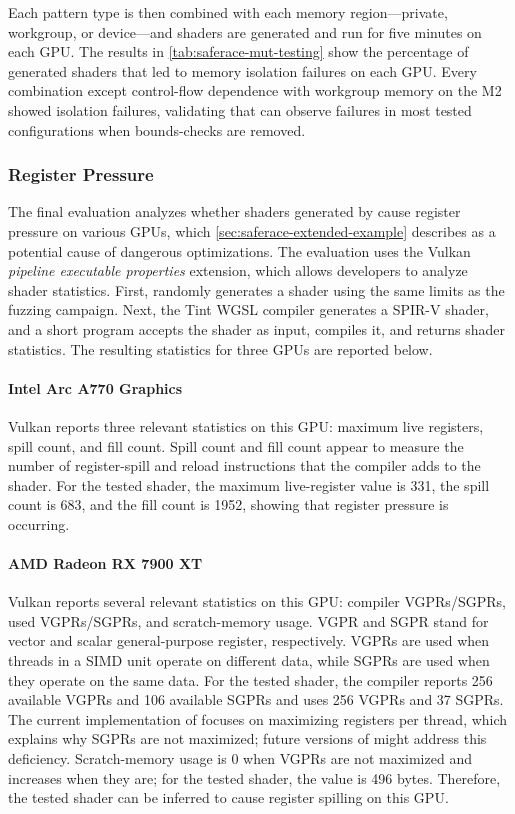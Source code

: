 Each pattern type is then combined with each memory region---private, workgroup, or device---and shaders are generated and run for five minutes on each GPU. The results in \mytab\ref{tab:saferace-mut-testing} show the percentage of generated shaders that led to memory isolation failures on each GPU. Every combination except control-flow dependence with workgroup memory on the M2 showed isolation failures, validating that \wgslmemsmith can observe failures in most tested configurations when bounds-checks are removed.

\subsubsection{Register Pressure}
The final evaluation analyzes whether shaders generated by \wgslmemsmith cause register pressure on various GPUs, which \mysec\ref{sec:saferace-extended-example} describes as a potential cause of dangerous optimizations. The evaluation uses the Vulkan \textit{pipeline executable properties} extension, which allows developers to analyze shader statistics. First, \wgslmemsmith randomly generates a shader using the same limits as the fuzzing campaign. Next, the Tint WGSL compiler generates a SPIR-V shader, and a short program accepts the shader as input, compiles it, and returns shader statistics. The resulting statistics for three GPUs are reported below.

\paragraph{Intel Arc A770 Graphics} Vulkan reports three relevant statistics on this GPU: maximum live registers, spill count, and fill count. Spill count and fill count appear to measure the number of register-spill and reload instructions that the compiler adds to the shader. For the tested shader, the maximum live-register value is 331, the spill count is 683, and the fill count is 1952, showing that register pressure is occurring.

\paragraph{AMD Radeon RX 7900 XT} Vulkan reports several relevant statistics on this GPU: compiler VGPRs/SGPRs, used VGPRs/SGPRs, and scratch-memory usage. VGPR and SGPR stand for vector and scalar general-purpose register, respectively. VGPRs are used when threads in a SIMD unit operate on different data, while SGPRs are used when they operate on the same data. For the tested shader, the compiler reports 256 available VGPRs and 106 available SGPRs and uses 256 VGPRs and 37 SGPRs. The current implementation of \wgslmemsmith focuses on maximizing registers per thread, which explains why SGPRs are not maximized; future versions of \wgslmemsmith might address this deficiency. Scratch-memory usage is 0 when VGPRs are not maximized and increases when they are; for the tested shader, the value is 496 bytes. Therefore, the tested shader can be inferred to cause register spilling on this GPU.

